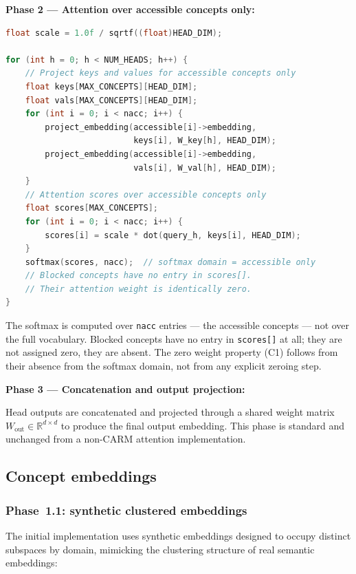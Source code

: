 \documentclass[11pt,a4paper]{article}
\theoremstyle{definition}
\begin{document}
\textbf{Phase 2 --- Attention over accessible concepts only:}

\begin{lstlisting}[language=C, caption={Phase 2: scaled dot-product attention over \texttt{accessible[]} only.},
                   label=lst:phase2]
float scale = 1.0f / sqrtf((float)HEAD_DIM);

for (int h = 0; h < NUM_HEADS; h++) {
    // Project keys and values for accessible concepts only
    float keys[MAX_CONCEPTS][HEAD_DIM];
    float vals[MAX_CONCEPTS][HEAD_DIM];
    for (int i = 0; i < nacc; i++) {
        project_embedding(accessible[i]->embedding,
                          keys[i], W_key[h], HEAD_DIM);
        project_embedding(accessible[i]->embedding,
                          vals[i], W_val[h], HEAD_DIM);
    }
    // Attention scores over accessible concepts only
    float scores[MAX_CONCEPTS];
    for (int i = 0; i < nacc; i++) {
        scores[i] = scale * dot(query_h, keys[i], HEAD_DIM);
    }
    softmax(scores, nacc);  // softmax domain = accessible only
    // Blocked concepts have no entry in scores[].
    // Their attention weight is identically zero.
}
\end{lstlisting}

The softmax is computed over \texttt{nacc} entries --- the accessible concepts
--- not over the full vocabulary. Blocked concepts have no entry in
\texttt{scores[]} at all; they are not assigned zero, they are absent. The
zero weight property (C1) follows from their absence from the softmax domain,
not from any explicit zeroing step.

\textbf{Phase 3 --- Concatenation and output projection:}

Head outputs are concatenated and projected through a shared weight matrix
$W_{\mathrm{out}} \in \mathbb{R}^{d \times d}$ to produce the final output
embedding. This phase is standard and unchanged from a non-CARM attention
implementation.

\subsection{Concept embeddings}
\label{sec:embeddings}

\subsubsection{Phase~1.1: synthetic clustered embeddings}

The initial implementation uses synthetic embeddings designed to occupy
distinct subspaces by domain, mimicking the clustering structure of real
semantic embeddings:
\end{document}
